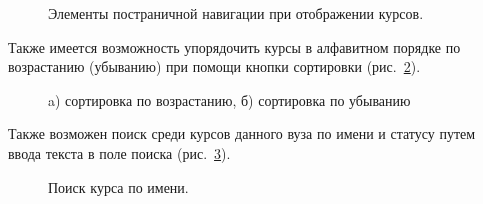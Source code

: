 \begin{figure}[H]
	\caption{Элементы постраничной навигации при отображении курсов.}
	\label{img:course:course_pagination}
\end{figure}

Также имеется возможность упорядочить курсы в алфавитном порядке по возрастанию (убыванию) при помощи кнопки сортировки (рис.~\ref{img:course:course_filter_btn}).

\begin{figure}[H]
	\begin{minipage}[h]{0.49\linewidth}
	\end{minipage}
	\hfill
	\begin{minipage}[h]{0.49\linewidth}
	\end{minipage}
	\caption{a) сортировка по возрастанию, б) сортировка по убыванию}
	\label{img:course:course_filter_btn}
\end{figure}

Также возможен поиск среди курсов данного вуза по имени и статусу путем ввода текста в поле поиска  (рис.~\ref{img:course:course_filter}).

\begin{figure}[H]
	\caption{Поиск курса по имени.}
	\label{img:course:course_filter}
\end{figure}

